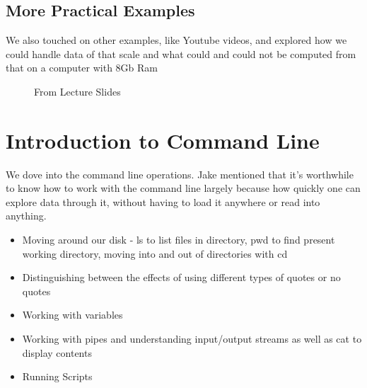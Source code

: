 \subsection{More Practical Examples}
We also touched on other examples, like Youtube videos, and explored how we could handle data of that scale and what could and could not be computed from that on a computer with 8Gb Ram 


\begin{figure}[h!]
  \begin{center}
\caption{
      From Lecture Slides
      }
\end{center}
\end{figure}

     
     
\section{Introduction to Command Line}
We dove into the command line operations. Jake mentioned that it's worthwhile to know how to work with the command line largely because how quickly one can explore data through it, without having to load it anywhere or read into anything.
\begin{itemize}
  \item Moving around our disk - ls to list files in directory, pwd to find present working directory, moving into and out of directories with cd
  \item Distinguishing between the effects of using different types of quotes or no quotes
  \item Working with variables
  \item Working with pipes and understanding input/output streams as well as cat to display contents
  \item Running Scripts
\end{itemize}

